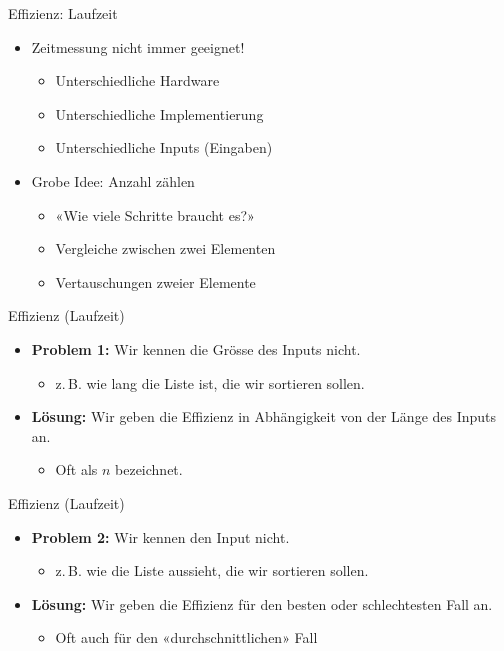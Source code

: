 \begin{frame}[text=large]{Effizienz: Laufzeit}
  \begin{itemize}
    \item Zeitmessung nicht immer geeignet!
    \begin{itemize}
      \item Unterschiedliche Hardware
      \item Unterschiedliche Implementierung
      \item Unterschiedliche Inputs (Eingaben)
    \end{itemize}
    \item<2-> Grobe Idee: Anzahl  zählen
    \begin{itemize}
      \item<2-> «Wie viele Schritte braucht es?»
      \item<2-> Vergleiche zwischen zwei Elementen
      \item<2-> Vertauschungen zweier Elemente
    \end{itemize}
  \end{itemize}
\end{frame}

\begin{frame}[text=large]{Effizienz (Laufzeit)}
  \begin{itemize}
    \item \textbf{Problem 1:} Wir kennen die Grösse des Inputs nicht.
    \begin{itemize}
      \item z.\,B. wie lang die Liste ist, die wir sortieren sollen.
    \end{itemize}
    \item \textbf{Lösung:} Wir geben die Effizienz in Abhängigkeit von der Länge des Inputs an.
    \begin{itemize}
      \item Oft als $n$ bezeichnet.
    \end{itemize}
  \end{itemize}
\end{frame}

\begin{frame}[text=large]{Effizienz (Laufzeit)}
  \begin{itemize}
    \item \textbf{Problem 2:} Wir kennen den Input nicht.
    \begin{itemize}
      \item z.\,B. wie die Liste aussieht, die wir sortieren sollen.
    \end{itemize}
    \item \textbf{Lösung:} Wir geben die Effizienz für den besten oder schlechtesten Fall an.
    \begin{itemize}
      \item Oft auch für den «durchschnittlichen» Fall
    \end{itemize}
  \end{itemize}
\end{frame}

